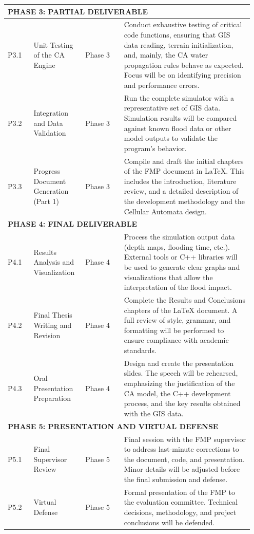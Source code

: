 \begin{longtable}{p{0.1\linewidth} p{0.2\linewidth} p{0.15\linewidth} p{0.5\linewidth}}
    \multicolumn{4}{l}{\textbf{PHASE 3: PARTIAL DELIVERABLE}} \\
    \midrule
    P3.1 & Unit Testing of the CA Engine & Phase 3 & Conduct exhaustive testing of critical code functions, ensuring that GIS data reading, terrain initialization, and, mainly, the CA water propagation rules behave as expected. Focus will be on identifying precision and performance errors. \\
    P3.2 & Integration and Data Validation & Phase 3 & Run the complete simulator with a representative set of GIS data. Simulation results will be compared against known flood data or other model outputs to validate the program's behavior. \\
    P3.3 & Progress Document Generation (Part 1) & Phase 3 & Compile and draft the initial chapters of the FMP document in LaTeX. This includes the introduction, literature review, and a detailed description of the development methodology and the Cellular Automata design. \\
    \midrule

    \multicolumn{4}{l}{\textbf{PHASE 4: FINAL DELIVERABLE}} \\
    \midrule
    P4.1 & Results Analysis and Visualization & Phase 4 & Process the simulation output data (depth maps, flooding time, etc.). External tools or C++ libraries will be used to generate clear graphs and visualizations that allow the interpretation of the flood impact. \\
    P4.2 & Final Thesis Writing and Revision & Phase 4 & Complete the Results and Conclusions chapters of the LaTeX document. A full review of style, grammar, and formatting will be performed to ensure compliance with academic standards. \\
    P4.3 & Oral Presentation Preparation & Phase 4 & Design and create the presentation slides. The speech will be rehearsed, emphasizing the justification of the CA model, the C++ development process, and the key results obtained with the GIS data. \\
    \midrule
    
    \multicolumn{4}{l}{\textbf{PHASE 5: PRESENTATION AND VIRTUAL DEFENSE}} \\
    \midrule
    P5.1 & Final Supervisor Review & Phase 5 & Final session with the FMP supervisor to address last-minute corrections to the document, code, and presentation. Minor details will be adjusted before the final submission and defense. \\
    P5.2 & Virtual Defense & Phase 5 & Formal presentation of the FMP to the evaluation committee. Technical decisions, methodology, and project conclusions will be defended. \\
    \bottomrule
\end{longtable}

